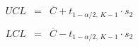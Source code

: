 \documentclass[12pt]{article}
\begin{document}
\pagestyle{empty}
\Large
{}
\pagecolor{ehandbook}

\boldmath
\begin{eqnarray*}
UCL &=& \overline{C} + t_{1-\alpha/2, \, K-1} \cdot  s_2 \\
      &  & \\
LCL &=& \overline{C} - t_{1-\alpha/2, \, K-1} \cdot  s_2  
\end{eqnarray*}
\end{document}
